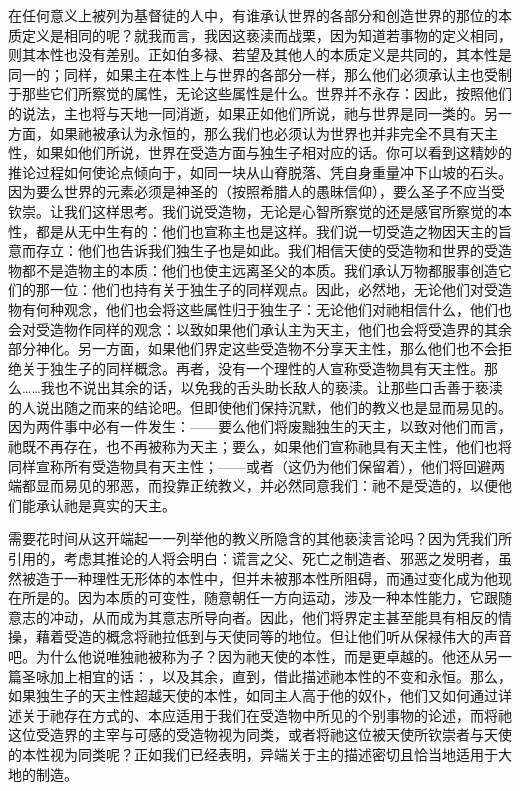 在任何意义上被列为基督徒的人中，有谁承认世界的各部分和创造世界的那位的本质定义是相同的呢？就我而言，我因这亵渎而战栗，因为知道若事物的定义相同，则其本性也没有差别。正如伯多禄、若望及其他人的本质定义是共同的，其本性是同一的；同样，如果主在本性上与世界的各部分一样，那么他们必须承认主也受制于那些它们所察觉的属性，无论这些属性是什么。世界并不永存：因此，按照他们的说法，主也将与天地一同消逝，如果正如他们所说，祂与世界是同一类的。另一方面，如果祂被承认为永恒的，那么我们也必须认为世界也并非完全不具有天主性，如果如他们所说，世界在受造方面与独生子相对应的话。你可以看到这精妙的推论过程如何使论点倾向于，如同一块从山脊脱落、凭自身重量冲下山坡的石头。因为要么世界的元素必须是神圣的（按照希腊人的愚昧信仰），要么圣子不应当受钦崇。让我们这样思考。我们说受造物，无论是心智所察觉的还是感官所察觉的本性，都是从无中生有的：他们也宣称主也是这样。我们说一切受造之物因天主的旨意而存立：他们也告诉我们独生子也是如此。我们相信天使的受造物和世界的受造物都不是造物主的本质：他们也使主远离圣父的本质。我们承认万物都服事创造它们的那一位：他们也持有关于独生子的同样观点。因此，必然地，无论他们对受造物有何种观念，他们也会将这些属性归于独生子：无论他们对祂相信什么，他们也会对受造物作同样的观念：以致如果他们承认主为天主，他们也会将受造界的其余部分神化。另一方面，如果他们界定这些受造物不分享天主性，那么他们也不会拒绝关于独生子的同样概念。再者，没有一个理性的人宣称受造物具有天主性。那么……我也不说出其余的话，以免我的舌头助长敌人的亵渎。让那些口舌善于亵渎的人说出随之而来的结论吧。但即使他们保持沉默，他们的教义也是显而易见的。因为两件事中必有一件发生：——要么他们将废黜独生的天主，以致对他们而言，祂既不再存在，也不再被称为天主；要么，如果他们宣称祂具有天主性，他们也将同样宣称所有受造物具有天主性；——或者（这仍为他们保留着），他们将回避两端都显而易见的邪恶，而投靠正统教义，并必然同意我们：祂不是受造的，以便他们能承认祂是真实的天主。\par

需要花时间从这开端起一一列举他的教义所隐含的其他亵渎言论吗？因为凭我们所引用的，考虑其推论的人将会明白：谎言之父、死亡之制造者、邪恶之发明者，虽然被造于一种理性无形体的本性中，但并未被那本性所阻碍，而通过变化成为他现在所是的。因为本质的可变性，随意朝任一方向运动，涉及一种本性能力，它跟随意志的冲动，从而成为其意志所导向者。因此，他们将界定主甚至能具有相反的情操，藉着受造的概念将祂拉低到与天使同等的地位。但让他们听从保禄伟大的声音吧。为什么他说唯独祂被称为子？因为祂天使的本性，而是更卓越的。他还从另一篇圣咏加上相宜的话：，以及其余，直到，借此描述祂本性的不变和永恒。那么，如果独生子的天主性超越天使的本性，如同主人高于他的奴仆，他们又如何通过详述关于祂存在方式的、本应适用于我们在受造物中所见的个别事物的论述，而将祂这位受造界的主宰与可感的受造物视为同类，或者将祂这位被天使所钦崇者与天使的本性视为同类呢？正如我们已经表明，异端关于主的描述密切且恰当地适用于大地的制造。\par

